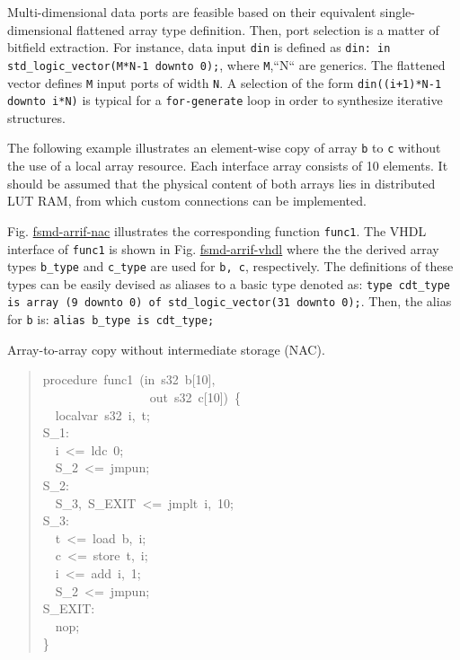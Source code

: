 \documentclass[a4paper]{article}
\begin{document}
Multi-dimensional data ports are feasible based on their equivalent single-
dimensional flattened array type definition. Then, port selection is a matter of
bitfield extraction. For instance, data input \texttt{din} is defined as
\texttt{din: in std\_logic\_vector(M*N-1 downto 0);}, where \texttt{M},``N`` are generics.
The flattened vector defines \texttt{M} input ports of width \texttt{N}. A selection of
the form \texttt{din((i+1)*N-1 downto i*N)} is typical for a \texttt{for-generate} loop in
order to synthesize iterative structures.

The following example illustrates an element-wise copy of array \texttt{b} to \texttt{c}
without the use of a local array resource. Each interface array consists of 10
elements. It should be assumed that the physical content of both arrays lies in
distributed LUT RAM, from which custom connections can be implemented.

Fig. \hyperref[fsmd-arrif-nac]{fsmd-arrif-nac} illustrates the corresponding function \texttt{func1}.
The VHDL interface of \texttt{func1} is shown in Fig. \hyperref[fsmd-arrif-vhdl]{fsmd-arrif-vhdl} where the
the derived array types \texttt{b\_type} and \texttt{c\_type} are used for \texttt{b, c},
respectively. The definitions of these types can be easily devised as aliases
to a basic type denoted as:
\texttt{type cdt\_type is array (9 downto 0) of std\_logic\_vector(31 downto 0);}.
Then, the alias for \texttt{b} is: \texttt{alias b\_type is cdt\_type;}

\label{fsmd-arrif-nac}
Array-to-array copy without intermediate storage (NAC).
%
\begin{quote}{\ttfamily \raggedright \noindent
procedure~func1~(in~s32~b{[}10{]},\\
~~~~~~~~~~~~~~~~~out~s32~c{[}10{]})~\{\\
~~localvar~s32~i,~t;\\
S\_1:\\
~~i~<=~ldc~0;\\
~~S\_2~<=~jmpun;\\
S\_2:\\
~~S\_3,~S\_EXIT~<=~jmplt~i,~10;\\
S\_3:\\
~~t~<=~load~b,~i;\\
~~c~<=~store~t,~i;\\
~~i~<=~add~i,~1;\\
~~S\_2~<=~jmpun;\\
S\_EXIT:\\
~~nop;\\
\}
}
\end{quote}
\end{document}
